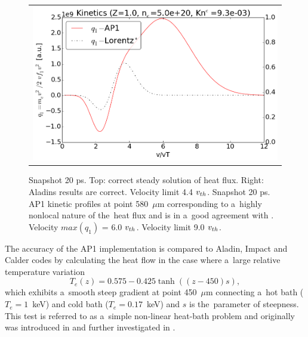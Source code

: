 \begin{figure}[tbh]
\begin{center}
\begin{tabular}{c}
	  \includegraphics[width=\figscale\textwidth]{../VFPdata/C7_Aladin_case5_nonlocal_kinetics.png}
    \end{tabular}
  \caption{  
  Snapshot 20 ps. Top: correct steady solution of heat flux. 
  Right: Aladins results are correct. Velocity limit 4.4 $v_{th}$.
  Snapshot 20 ps. AP1 kinetic profiles at point 580~$\mu$m corresponding to 
  a~highly nonlocal nature of the~heat flux %
  and is in a~good agreement with
  \cite{Sherlock_PoP2017}. Velocity $max(q_1)$ = 6.0 $v_{th}$. 
  Velocity limit 9.0 $v_{th}$.
  }
  \label{fig:C7_Aladin_case5}
  \end{center} 
\end{figure}

The accuracy of the AP1 implementation is compared to Aladin, Impact and Calder
codes by calculating the heat flow in the case
where a~large relative temperature variation
\begin{equation}
  T_e(z) = 0.575 - 0.425 \tanh\left((z-450) s\right) ,
  \label{eq:T_init}
\end{equation}
which exhibits a~smooth steep gradient at point 450~$\mu$m 
connecting a~hot bath ($T_e = 1$~keV) 
and cold bath ($T_e = 0.17$~keV) and $s$ is the~parameter of steepness. 
This test is referred to as a~simple non-linear heat-bath problem and
originally was introduced in \cite{marocchino2013} and further investigated
in  \cite{Sorbo_2015, Sorbo_2016, Sherlock_PoP2017, Brodrick_PoP2017}.


